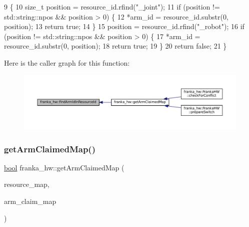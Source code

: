 \begin{DoxyCode}
9                                                                             \{
10   \textcolor{keywordtype}{size\_t} position = resource\_id.rfind(\textcolor{stringliteral}{"\_joint"});
11   \textcolor{keywordflow}{if} (position != std::string::npos && position > 0) \{
12     *arm\_id = resource\_id.substr(0, position);
13     \textcolor{keywordflow}{return} \textcolor{keyword}{true};
14   \}
15   position = resource\_id.rfind(\textcolor{stringliteral}{"\_robot"});
16   \textcolor{keywordflow}{if} (position != std::string::npos && position > 0) \{
17     *arm\_id = resource\_id.substr(0, position);
18     \textcolor{keywordflow}{return} \textcolor{keyword}{true};
19   \}
20   \textcolor{keywordflow}{return} \textcolor{keyword}{false};
21 \}
\end{DoxyCode}
Here is the caller graph for this function\+:
\nopagebreak
\begin{figure}[H]
\begin{center}
\leavevmode
\includegraphics[width=350pt]{namespacefranka__hw_aa86d54ddd446acb5a2101bfcc944b2c8_icgraph}
\end{center}
\end{figure}
\mbox{\label{namespacefranka__hw_af08f089686416ffb7904fbe86f19b8a9}} 
\subsubsection{\texorpdfstring{get\+Arm\+Claimed\+Map()}{getArmClaimedMap()}}
{\footnotesize\ttfamily \hyperlink{classbool}{bool} franka\+\_\+hw\+::get\+Arm\+Claimed\+Map (\begin{DoxyParamCaption}\item[{\hyperlink{namespacefranka__hw_a1fae0c56c9a08fdeb137e601f876cc77}{Resource\+With\+Claims\+Map} \&}]{resource\+\_\+map,  }\item[{\hyperlink{namespacefranka__hw_a9b9c672b3e064953e816024fc2f9cf0f}{Arm\+Claimed\+Map} \&}]{arm\+\_\+claim\+\_\+map }\end{DoxyParamCaption})}



